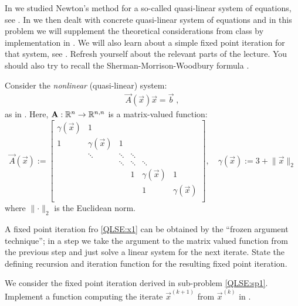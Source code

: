 
\renewcommand{\chpt}{ch_iterativenlse}


\begin{problem} \label{prb:quasilin}

In  we studied Newton's method for a so-called quasi-linear system
of equations, see . In  we then dealt with concrete 
quasi-linear system of equations and in this problem we will supplement the
theoretical considerations from class by implementation in \Eigen{}. We will also
learn about a simple fixed point iteration for that system, see
. Refresh yourself about the relevant parts of
the lecture. You should also try to recall the Sherman-Morrison-Woodbury formula .

Consider the \emph{nonlinear} (quasi-linear) system:
\begin{gather*}
  \label{QLSE:x1}
  \vec{A}(\vec{x}) \vec{x} = \vec{b}\;,
\end{gather*}
as in . Here, $\mathbf{A}: \mathbb{R}^n \rightarrow \mathbb{R}^{n,n}$ is a matrix-valued function:
\[
 \vec{A}(\vec{x}) := \begin{bmatrix}
                      \gamma(\vec{x})	& 1 & & \\
                      1			& \gamma(\vec{x}) & 1 \\
                      & \ddots & \ddots & \ddots \\
                      & & \ddots & \ddots & \ddots \\
                      & & & 1			& \gamma(\vec{x}) & 1 \\
                      & & & & 1			& \gamma(\vec{x}) \\
                     \end{bmatrix}, \quad \gamma(\vec{x}) := 3 + \lVert \vec{x} \rVert_2
\]
where $\lVert \cdot \rVert_2$ is the Euclidean norm.
 
\begin{subproblem}[1]
  \label{QLSE:sp1}
  A fixed point iteration fro \eqref{QLSE:x1} can be obtained by the ``frozen
  argument technique''; in a step we take the argument to the matrix valued
  function from the previous step and just solve a linear system for the
  next iterate. State the defining recursion and iteration function for
  the resulting fixed point iteration.
\end{subproblem}

\begin{subproblem}[2]
  We consider the fixed point iteration derived in sub-problem \ref{QLSE:sp1}.
  Implement a function computing the iterate $\vec{x}^{(k+1)}$ from
  $\vec{x}^{(k)}$ in \Eigen{}.


\end{subproblem}
\end{problem}
